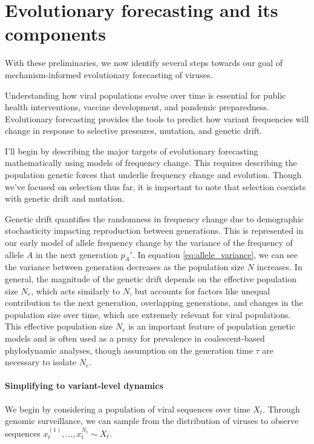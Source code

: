 \section{Evolutionary forecasting and its components}%

With these preliminaries, we now identify several steps towards our goal of mechanism-informed evolutionary forecasting of viruses.

Understanding how viral populations evolve over time is essential for public health interventions, vaccine development, and pandemic preparedness. 
Evolutionary forecasting provides the tools to predict how variant frequencies will change in response to selective pressures, mutation, and genetic drift.

I'll begin by describing the major targets of evolutionary forecasting mathematically using models of frequency change.
This requires describing the population genetic forces that underlie frequency change and evolution.
Though we've focused on selection thus far, it is important to note that selection coexists with genetic drift and mutation.

Genetic drift quantifies the randomness in frequency change due to demographic stochasticity impacting reproduction between generations.
This is represented in our early model of allele frequency change by the variance of the frequency of allele $A$ in the next generation $p_A'$.
In equation \ref{eq:allele_variance}, we can see the variance between generation decreases as the population size $N$ increases.
In general, the magnitude of the genetic drift depends on the effective population size $N_e$, which acts similarly to $N$, but accounts for factors like unequal contribution to the next generation, overlapping generations, and changes in the population size over time, which are extremely relevant for viral populations.
This effective population size $N_e$ is an important feature of population genetic models and is often used as a proxy for prevalence in coalescent-based phylodynamic analyses, though assumption on the generation time $\tau$ are necessary to isolate $N_e$. \cite{MullerWagner2021}

\paragraph{Simplifying to variant-level dynamics}

We begin by considering a population of viral sequences over time $X_t$.
Through genomic surveillance, we can sample from the distribution of viruses to observe sequences $x_t^{(1)}, \ldots, x_t^{{N_t}} \sim X_t$.

